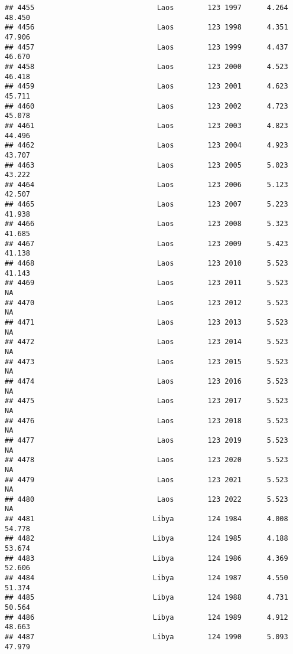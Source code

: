 \documentclass[
]{article}
\begin{document}
\begin{verbatim}
## 4455                             Laos        123 1997      4.264     48.450
## 4456                             Laos        123 1998      4.351     47.906
## 4457                             Laos        123 1999      4.437     46.670
## 4458                             Laos        123 2000      4.523     46.418
## 4459                             Laos        123 2001      4.623     45.711
## 4460                             Laos        123 2002      4.723     45.078
## 4461                             Laos        123 2003      4.823     44.496
## 4462                             Laos        123 2004      4.923     43.707
## 4463                             Laos        123 2005      5.023     43.222
## 4464                             Laos        123 2006      5.123     42.507
## 4465                             Laos        123 2007      5.223     41.938
## 4466                             Laos        123 2008      5.323     41.685
## 4467                             Laos        123 2009      5.423     41.138
## 4468                             Laos        123 2010      5.523     41.143
## 4469                             Laos        123 2011      5.523         NA
## 4470                             Laos        123 2012      5.523         NA
## 4471                             Laos        123 2013      5.523         NA
## 4472                             Laos        123 2014      5.523         NA
## 4473                             Laos        123 2015      5.523         NA
## 4474                             Laos        123 2016      5.523         NA
## 4475                             Laos        123 2017      5.523         NA
## 4476                             Laos        123 2018      5.523         NA
## 4477                             Laos        123 2019      5.523         NA
## 4478                             Laos        123 2020      5.523         NA
## 4479                             Laos        123 2021      5.523         NA
## 4480                             Laos        123 2022      5.523         NA
## 4481                            Libya        124 1984      4.008     54.778
## 4482                            Libya        124 1985      4.188     53.674
## 4483                            Libya        124 1986      4.369     52.606
## 4484                            Libya        124 1987      4.550     51.374
## 4485                            Libya        124 1988      4.731     50.564
## 4486                            Libya        124 1989      4.912     48.663
## 4487                            Libya        124 1990      5.093     47.979

\end{verbatim}
\end{document}

